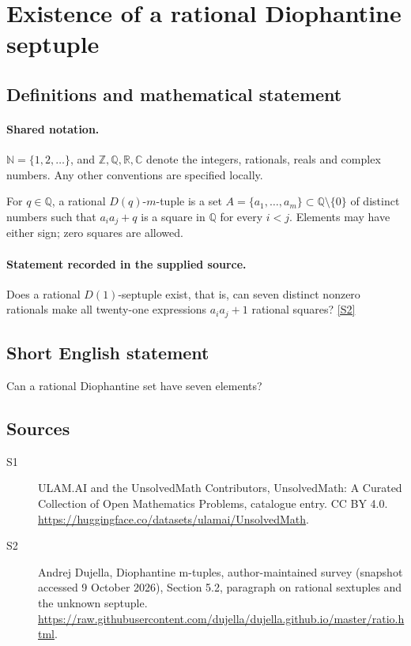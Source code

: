 \documentclass[11pt]{article}
\newcommand{\sref}[2]{\hyperlink{source:#1:#2}{[S#2]}}
\begin{document}
\section{Existence of a rational Diophantine septuple}\label{statement}

\subsection{Definitions and mathematical statement}

\paragraph{Shared notation.}$\mathbb N=\{1,2,\ldots\}$, and $\mathbb Z,\mathbb Q,\mathbb R,\mathbb C$ denote the integers, rationals, reals and complex numbers. Any other conventions are specified locally.


For $q\in\mathbb Q$, a rational $D(q)$-$m$-tuple is a set $A=\{a_1,\ldots,a_m\}\subset\mathbb Q\setminus\{0\}$ of distinct numbers such that $a_i a_j+q$ is a square in $\mathbb Q$ for every $i<j$. Elements may have either sign; zero squares are allowed.
\paragraph{Statement recorded in the supplied source.}
Does a rational $D(1)$-septuple exist, that is, can seven distinct nonzero rationals make all twenty-one expressions $a_i a_j+1$ rational squares? \sref{statement}{2}
\subsection{Short English statement}
Can a rational Diophantine set have seven elements?
\subsection{Sources}
\begin{description}
\item[\hypertarget{source:statement:1}{S1}] ULAM.AI and the UnsolvedMath Contributors, UnsolvedMath: A Curated Collection of Open Mathematics Problems, catalogue entry. CC BY 4.0. \url{https://huggingface.co/datasets/ulamai/UnsolvedMath}.
\item[\hypertarget{source:statement:2}{S2}] Andrej Dujella, Diophantine m-tuples, author-maintained survey (snapshot accessed 9 October 2026), Section 5.2, paragraph on rational sextuples and the unknown septuple. \url{https://raw.githubusercontent.com/dujella/dujella.github.io/master/ratio.html}.
\end{description}
\label{end:statement}
\end{document}
